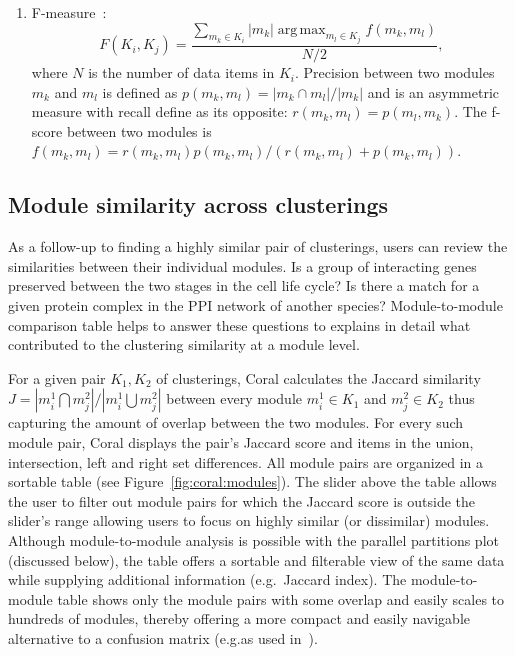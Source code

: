 \documentclass[12pt]{cmuthesis}
\makeatletter
\newcommand\Coral{Coral\xspace}
\newcommand{\eg}{e.g.\@}
\DeclareMathOperator*{\argmax}{arg\,max}
\makeatother
\begin{document}
\begin{enumerate}
    \item F-measure~\cite{Meila2003}:
    \[
    F(K_i,K_j) = \frac{ \sum_{m_k \in K_i} |m_k| \argmax_{m_l \in K_j} f(m_k, m_l) }{N/2},
    \]
    where $N$ is the number of data items in $K_i$. Precision between two modules $m_k$ and $m_l$ is defined as $p(m_k, m_l) = |m_k \cap m_l| / |m_k|$ and is an asymmetric measure with recall define as its opposite: $r(m_k, m_l) = p(m_l, m_k)$. The f-score between two modules is $f(m_k,m_l) = r(m_k, m_l) p(m_k, m_l) / ( r(m_k, m_l) + p(m_k, m_l) )$.

  \end{enumerate}

  \subsection{Module similarity across clusterings}
  \label{sec:modules}

  As a follow-up to finding a highly similar pair of clusterings, users can review the similarities between their individual modules. Is a group of interacting genes preserved between the two stages in the cell life cycle? Is there a match for a given protein complex in the PPI network of another species? Module-to-module comparison table helps to answer these questions to explains in detail what contributed to the clustering similarity at a  module level.

  For a given pair $K_1, K_2$ of clusterings, \Coral calculates the Jaccard similarity $J = |m^{1}_{i} \bigcap m^{2}_{j}| / |m^{1}_{i} \bigcup m^{2}_{j} |$ between every module $m^{1}_{i} \in K_1$ and $m^{2}_{j} \in K_2$ thus capturing the amount of overlap between the two modules. For every such module pair, \Coral displays the pair's Jaccard score and items in the union, intersection, left and right set differences. All module pairs are organized in a sortable table (see Figure~\ref{fig:coral:modules}). The slider above the table allows the user to filter out module pairs for which the Jaccard score is outside the slider's range allowing users to focus on highly similar (or dissimilar) modules. Although module-to-module analysis is possible with the parallel partitions plot (discussed below), the table offers a sortable and filterable view of the same data while supplying additional information (\eg~Jaccard index). The module-to-module table shows only the module pairs with some overlap and easily scales to hundreds of modules, thereby offering a more compact and easily navigable alternative to a confusion matrix (\eg\@ as used in~\cite{Langfelder2011}).
\end{document}
